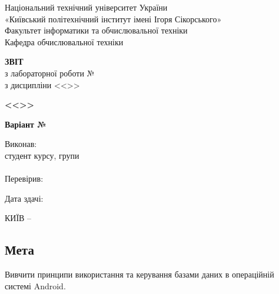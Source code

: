 \documentclass[14pt, a4paper]{extreport}
\begin{document}
	
	\begin{titlepage}
		\begin{center}
			\normalsize
			Національний технічний університет України\\
			«Київський політехнічний інститут імені Ігоря Сікорського» \\[0.5em]
			Факультет інформатики та обчислювальної техніки\\
			Кафедра обчислювальної техніки
			
			\vfill
			
			{\large \textbf{ЗВІТ}\\[0.5em]}
			{з лабораторної роботи №\LabNumber \\}
			{з дисципліни <<\CourseTitle>>}
			
			\vspace{2em}
			
			{\textbf{<<\Topic>>}}
			
			\vspace{1em}
			
			{\textbf{Варіант №\Variant}}
			
			\vfill
			
			\begin{flushright}
				Виконав: \\ студент \CourseNumber{} курсу, групи \StudentGroup \\
				\StudentName \\[1em]
				Перевірив: \\ \Teacher
			\end{flushright}
			
			\vfill
			
			\begin{flushright}
				Дата здачі: \DTMtoday
			\end{flushright}
			
			\vspace{5em}
			КИЇВ -- \ReportYear
		\end{center}
	\end{titlepage}
	
	\clearpage
	\setcounter{page}{2}
	
	\subsection*{Мета} 
	
	Вивчити принципи використання та керування базами даних в операційній системі Android.
	
\end{document}
